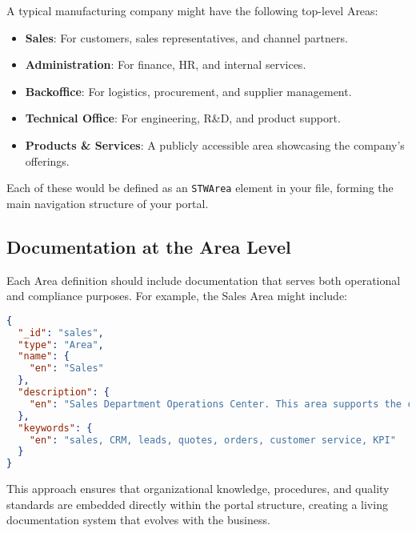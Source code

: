 A typical manufacturing company might have the following top-level Areas:
\begin{itemize}
    \item \textbf{Sales}: For customers, sales representatives, and channel partners.
    \item \textbf{Administration}: For finance, HR, and internal services.
    \item \textbf{Backoffice}: For logistics, procurement, and supplier management.
    \item \textbf{Technical Office}: For engineering, R\&D, and product support.
    \item \textbf{Products \& Services}: A publicly accessible area showcasing the company's offerings.
\end{itemize}

Each of these would be defined as an \texttt{STWArea} element in your \wbdl{} file, forming the main navigation structure of your portal.

\subsection{Documentation at the Area Level}
\label{sec:area-documentation}

Each Area definition should include documentation that serves both operational and compliance purposes. For example, the Sales Area might include:

\begin{lstlisting}[language=JSON,caption={Sales Area with Documentation},label={lst:sales-area-docs}]
{
  "_id": "sales",
  "type": "Area",
  "name": {
    "en": "Sales"
  },
  "description": {
    "en": "Sales Department Operations Center. This area supports the complete sales lifecycle from lead generation to order fulfillment. All activities comply with our Customer Relationship Management Policy CRM-POL-001. Key Processes: Lead qualification (PROC-SALES-001), Quote generation (PROC-SALES-002), Order processing (PROC-SALES-003). Performance Targets: Response time to quotes: <24 hours, Customer satisfaction: >90%. Department Manager: Jane Smith (ext. 2001)."
  },
  "keywords": {
    "en": "sales, CRM, leads, quotes, orders, customer service, KPI"
  }
}
\end{lstlisting}

This approach ensures that organizational knowledge, procedures, and quality standards are embedded directly within the portal structure, creating a living documentation system that evolves with the business.

